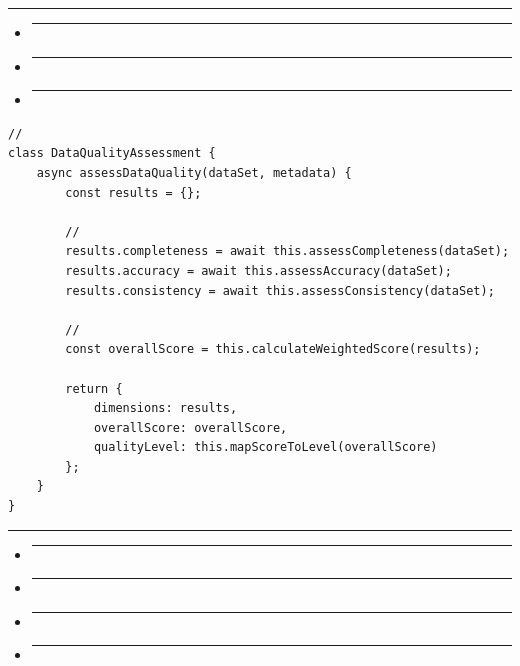 \begin{center}\rule{0.5\linewidth}{0.5pt}\end{center}

\begin{itemize}
\item
  \begin{center}\rule{0.5\linewidth}{0.5pt}\end{center}
\item
  \begin{center}\rule{0.5\linewidth}{0.5pt}\end{center}
\item
  \begin{center}\rule{0.5\linewidth}{0.5pt}\end{center}
\end{itemize}

\begin{verbatim}
// 
class DataQualityAssessment {
    async assessDataQuality(dataSet, metadata) {
        const results = {};
        
        // 
        results.completeness = await this.assessCompleteness(dataSet);
        results.accuracy = await this.assessAccuracy(dataSet);
        results.consistency = await this.assessConsistency(dataSet);
        
        // 
        const overallScore = this.calculateWeightedScore(results);
        
        return {
            dimensions: results,
            overallScore: overallScore,
            qualityLevel: this.mapScoreToLevel(overallScore)
        };
    }
}
\end{verbatim}

\begin{center}\rule{0.5\linewidth}{0.5pt}\end{center}

\begin{itemize}
\item
  \begin{center}\rule{0.5\linewidth}{0.5pt}\end{center}
\item
  \begin{center}\rule{0.5\linewidth}{0.5pt}\end{center}
\item
  \begin{center}\rule{0.5\linewidth}{0.5pt}\end{center}
\item
  \begin{center}\rule{0.5\linewidth}{0.5pt}\end{center}
\end{itemize}

